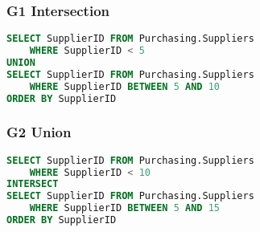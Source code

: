 \subsubsection*{G1 Intersection}

\begin{lstlisting}[language=SQL]
SELECT SupplierID FROM Purchasing.Suppliers 
    WHERE SupplierID < 5
UNION
SELECT SupplierID FROM Purchasing.Suppliers 
    WHERE SupplierID BETWEEN 5 AND 10
ORDER BY SupplierID
\end{lstlisting}

\subsubsection*{G2 Union}

\begin{lstlisting}[language=SQL]
SELECT SupplierID FROM Purchasing.Suppliers 
    WHERE SupplierID < 10
INTERSECT
SELECT SupplierID FROM Purchasing.Suppliers 
    WHERE SupplierID BETWEEN 5 AND 15
ORDER BY SupplierID
\end{lstlisting}
